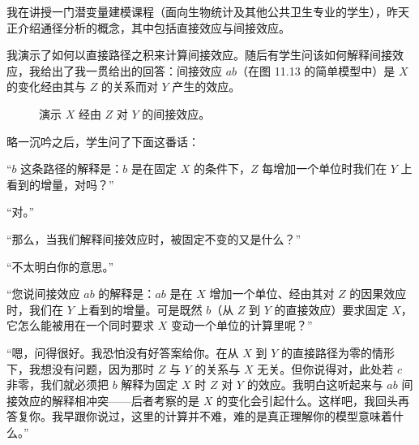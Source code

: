 
我在讲授一门潜变量建模课程（面向生物统计及其他公共卫生专业的学生），昨天正介绍通径分析的概念，其中包括直接效应与间接效应。

我演示了如何以直接路径之积来计算间接效应。随后有学生问该如何解释间接效应，我给出了我一贯给出的回答：间接效应 $ab$（在图 11.13 的简单模型中）是 $X$ 的变化经由其与 $Z$ 的关系而对 $Y$ 产生的效应。

\begin{figure}[htbp]
\centering
{}
\caption{演示 $X$ 经由 $Z$ 对 $Y$ 的间接效应。}
\label{fig:11.13}
\end{figure}

略一沉吟之后，学生问了下面这番话：

“$b$ 这条路径的解释是：$b$ 是在固定 $X$ 的条件下，$Z$ 每增加一个单位时我们在 $Y$ 上看到的增量，对吗？”

“对。”

“那么，当我们解释间接效应时，被固定不变的又是什么？”

“不太明白你的意思。”

“您说间接效应 $ab$ 的解释是：$ab$ 是在 $X$ 增加一个单位、经由其对 $Z$ 的因果效应时，我们在 $Y$ 上看到的增量。可是既然 $b$（从 $Z$ 到 $Y$ 的直接效应）要求固定 $X$，它怎么能被用在一个同时要求 $X$ 变动一个单位的计算里呢？”

“嗯，问得很好。我恐怕没有好答案给你。在从 $X$ 到 $Y$ 的直接路径为零的情形下，我想没有问题，因为那时 $Z$ 与 $Y$ 的关系与 $X$ 无关。但你说得对，此处若 $c$ 非零，我们就必须把 $b$ 解释为固定 $X$ 时 $Z$ 对 $Y$ 的效应。我明白这听起来与 $ab$ 间接效应的解释相冲突——后者考察的是 $X$ 的变化会引起什么。这样吧，我回头再答复你。我早跟你说过，这里的计算并不难，难的是真正理解你的模型意味着什么。”


